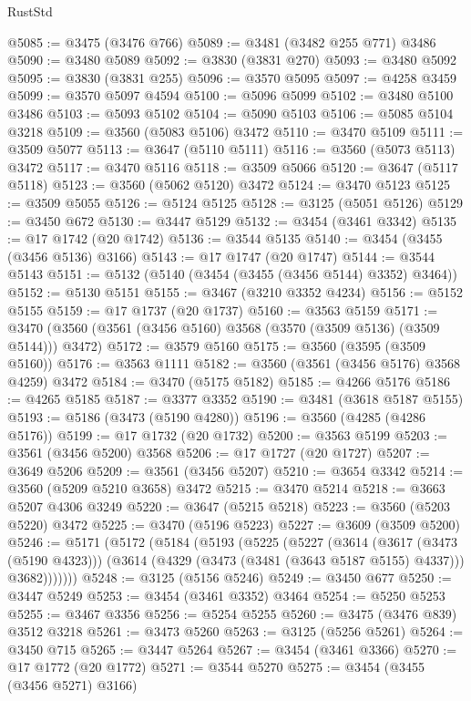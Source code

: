 \begin{lexlean}{RustStd}
\begin{coremodule}
@5085 := @3475 (@3476 @766)
@5089 := @3481 (@3482 @255 @771) @3486
@5090 := @3480 @5089
@5092 := @3830 (@3831 @270)
@5093 := @3480 @5092
@5095 := @3830 (@3831 @255)
@5096 := @3570 @5095
@5097 := @4258 @3459
@5099 := @3570 @5097 @4594
@5100 := @5096 @5099
@5102 := @3480 @5100 @3486
@5103 := @5093 @5102
@5104 := @5090 @5103
@5106 := @5085 @5104 @3218
@5109 := @3560 (@5083 @5106) @3472
@5110 := @3470 @5109
@5111 := @3509 @5077
@5113 := @3647 (@5110 @5111)
@5116 := @3560 (@5073 @5113) @3472
@5117 := @3470 @5116
@5118 := @3509 @5066
@5120 := @3647 (@5117 @5118)
@5123 := @3560 (@5062 @5120) @3472
@5124 := @3470 @5123
@5125 := @3509 @5055
@5126 := @5124 @5125
@5128 := @3125 (@5051 @5126)
@5129 := @3450 @672
@5130 := @3447 @5129
@5132 := @3454 (@3461 @3342)
@5135 := @17 @1742 (@20 @1742)
@5136 := @3544 @5135
@5140 := @3454 (@3455 (@3456 @5136) @3166)
@5143 := @17 @1747 (@20 @1747)
@5144 := @3544 @5143
@5151 := @5132 (@5140 (@3454 (@3455 (@3456 @5144) @3352) @3464))
@5152 := @5130 @5151
@5155 := @3467 (@3210 @3352 @4234)
@5156 := @5152 @5155
@5159 := @17 @1737 (@20 @1737)
@5160 := @3563 @5159
@5171 := @3470 (@3560 (@3561 (@3456 @5160) @3568 (@3570 (@3509 @5136) (@3509 @5144))) @3472)
@5172 := @3579 @5160
@5175 := @3560 (@3595 (@3509 @5160))
@5176 := @3563 @1111
@5182 := @3560 (@3561 (@3456 @5176) @3568 @4259) @3472
@5184 := @3470 (@5175 @5182)
@5185 := @4266 @5176
@5186 := @4265 @5185
@5187 := @3377 @3352
@5190 := @3481 (@3618 @5187 @5155)
@5193 := @5186 (@3473 (@5190 @4280))
@5196 := @3560 (@4285 (@4286 @5176))
@5199 := @17 @1732 (@20 @1732)
@5200 := @3563 @5199
@5203 := @3561 (@3456 @5200) @3568
@5206 := @17 @1727 (@20 @1727)
@5207 := @3649 @5206
@5209 := @3561 (@3456 @5207)
@5210 := @3654 @3342
@5214 := @3560 (@5209 @5210 @3658) @3472
@5215 := @3470 @5214
@5218 := @3663 @5207 @4306 @3249
@5220 := @3647 (@5215 @5218)
@5223 := @3560 (@5203 @5220) @3472
@5225 := @3470 (@5196 @5223)
@5227 := @3609 (@3509 @5200)
@5246 := @5171
    (@5172
      (@5184
        (@5193
          (@5225
            (@5227
              (@3614
                (@3617 (@3473 (@5190 @4323)))
                (@3614 (@4329 (@3473 (@3481 (@3643 @5187 @5155) @4337))) @3682)))))))
@5248 := @3125 (@5156 @5246)
@5249 := @3450 @677
@5250 := @3447 @5249
@5253 := @3454 (@3461 @3352) @3464
@5254 := @5250 @5253
@5255 := @3467 @3356
@5256 := @5254 @5255
@5260 := @3475 (@3476 @839) @3512 @3218
@5261 := @3473 @5260
@5263 := @3125 (@5256 @5261)
@5264 := @3450 @715
@5265 := @3447 @5264
@5267 := @3454 (@3461 @3366)
@5270 := @17 @1772 (@20 @1772)
@5271 := @3544 @5270
@5275 := @3454 (@3455 (@3456 @5271) @3166)

\end{coremodule}
\end{lexlean}
